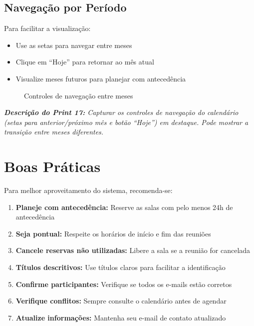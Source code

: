 \documentclass[12pt,a4paper]{article}
\begin{document}
\subsection{Navegação por Período}

Para facilitar a visualização:

\begin{itemize}[leftmargin=*]
    \item Use as setas para navegar entre meses
    \item Clique em ``Hoje'' para retornar ao mês atual
    \item Visualize meses futuros para planejar com antecedência
\end{itemize}

\begin{figure}[H]
    \centering
    \caption{Controles de navegação entre meses}
    \label{fig:navegacao}
\end{figure}

\textit{\textbf{Descrição do Print 17:} Capturar os controles de navegação do calendário (setas para anterior/próximo mês e botão ``Hoje'') em destaque. Pode mostrar a transição entre meses diferentes.}

\section{Boas Práticas}

Para melhor aproveitamento do sistema, recomenda-se:

\begin{enumerate}[leftmargin=*]
    \item \textbf{Planeje com antecedência:} Reserve as salas com pelo menos 24h de antecedência
    \item \textbf{Seja pontual:} Respeite os horários de início e fim das reuniões
    \item \textbf{Cancele reservas não utilizadas:} Libere a sala se a reunião for cancelada
    \item \textbf{Títulos descritivos:} Use títulos claros para facilitar a identificação
    \item \textbf{Confirme participantes:} Verifique se todos os e-mails estão corretos
    \item \textbf{Verifique conflitos:} Sempre consulte o calendário antes de agendar
    \item \textbf{Atualize informações:} Mantenha seu e-mail de contato atualizado
\end{enumerate}
\end{document}

